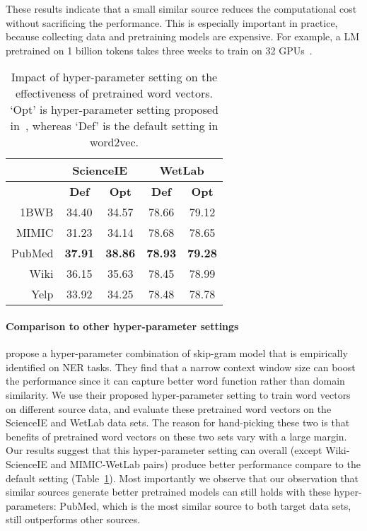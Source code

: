 \documentclass[11pt,a4paper]{article}
\begin{document}
These results indicate that a small similar source reduces the computational cost without sacrificing the performance. This is especially important in practice, because collecting data and pretraining models are expensive. For example, a LM pretrained on 1 billion tokens takes three weeks to train on 32 GPUs~\citep{Jozefowicz:Vinyals:arXiv:2016}. 

\begin{table}[pt!]
    \centering
    \begin{small}
    \begin{tabular}{r|c|c|c|c}
    \toprule
    & \multicolumn{2}{c}{\bf ScienceIE} & \multicolumn{2}{c}{\bf WetLab} \\ \hline
    \bf & \bf Def & \bf Opt & \bf Def & \bf Opt \\ \hline
    1BWB & 34.40 & 34.57 & 78.66 & 79.12 \\
    MIMIC & 31.23 & 34.14 & 78.68 & 78.65 \\
    PubMed & \bf 37.91 & \bf 38.86 & \bf 78.93 & \bf 79.28 \\
    Wiki & 36.15 & 35.63 & 78.45 & 78.99 \\
    Yelp & 33.92 & 34.25 & 78.48 & 78.78 \\
    \bottomrule
    \end{tabular}
    \caption{Impact of hyper-parameter setting on the effectiveness of pretrained word vectors. `Opt' is hyper-parameter setting proposed in~\citep{Chiu:Crichton:BioNLP:2016}, whereas `Def' is the default setting in word2vec.}
    \label{tab:best-hyper-parameter}
    \end{small}
\end{table}



\paragraph{Comparison to other hyper-parameter settings}
\citet{Chiu:Crichton:BioNLP:2016} propose a hyper-parameter combination of skip-gram model that is empirically identified on NER tasks. 
They find that a narrow context window size can boost the performance since it can capture better word function rather than domain similarity. 
We use their proposed hyper-parameter setting to train word vectors on different source data, and evaluate these pretrained word vectors on the ScienceIE and WetLab data sets. 
The reason for hand-picking these two is that benefits of pretrained word vectors on these two sets vary with a large margin. 
Our results suggest that this hyper-parameter setting can overall (except Wiki-ScienceIE and MIMIC-WetLab pairs) produce better performance compare to the default setting (Table~\ref{tab:best-hyper-parameter}). 
Most importantly we observe that our observation that similar sources generate better pretrained models can still holds with these hyper-parameters: PubMed, which is the most similar source to both target data sets, still outperforms other sources.
\end{document}
